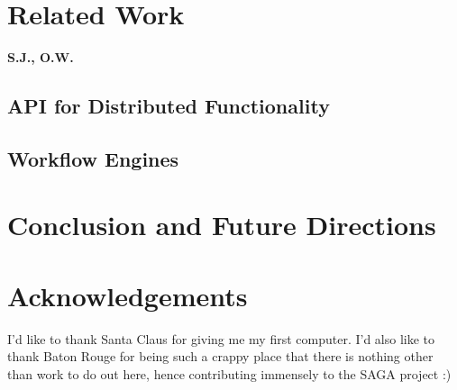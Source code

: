\documentclass[a4paper,10pt]{article}
\begin{document}
\section{Related Work}
 \textbf{S.J., O.W.}

\subsection{API for Distributed Functionality}

\subsection{Workflow Engines}

\section{Conclusion and Future Directions}

\section{Acknowledgements}
 
I'd like to thank Santa Claus for giving me my first computer. I'd
also like to thank Baton Rouge for being such a crappy place that
there is nothing other than work to do out here, hence contributing
immensely to the SAGA project :)


 

\end{document}
